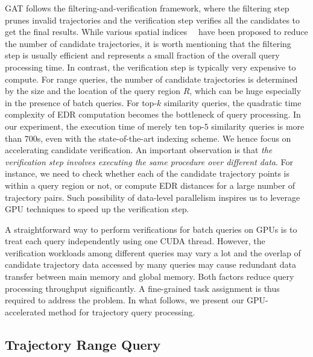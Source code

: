 \documentclass[10pt,conference,letterpaper]{IEEEtran}
\newcommand{\frname}{GAT\xspace }
\begin{document}
\frname follows the filtering-and-verification framework, where the filtering step prunes invalid trajectories and the verification step verifies all the candidates to get the final results.
While various spatial indices~\cite{DBLP:conf/icde/Cudre-MaurouxWM10}~\cite{DBLP:conf/cidr/ChakkaEP03} have been proposed to reduce the number of candidate trajectories, it is worth mentioning that the filtering step is usually efficient and represents a small fraction of the overall query processing time. In contrast, the verification step is typically very expensive to compute.
%
For range queries, the number of candidate trajectories is determined by the size and the location of the query region $R$, which can be huge especially in the presence of batch queries. For top-$k$ similarity queries, the quadratic time complexity of EDR computation becomes the bottleneck of query processing. In our experiment, the execution time of merely ten top-$5$ similarity queries is more than $700$s, even with the state-of-the-art indexing scheme.
%
We hence focus on accelerating candidate verification. An important observation is that \emph{the verification step involves executing the same procedure over different data}. For instance,  we need to check whether each of the candidate trajectory points is within a query region or not, or compute EDR distances for a large number of trajectory pairs. Such possibility of data-level parallelism inspires us to leverage GPU techniques to speed up the verification step.

A straightforward way to perform verifications for batch queries on GPUs is to treat each query independently using one CUDA thread.
However, the verification workloads among different queries may vary a lot and the overlap of candidate trajectory data accessed by many queries may cause redundant data transfer between main memory and global memory. Both factors reduce query processing throughput significantly.
A fine-grained task assignment is thus required to address the problem.
In what follows, we present our GPU-accelerated method for trajectory query processing.




\subsection{Trajectory Range Query}
\end{document}
